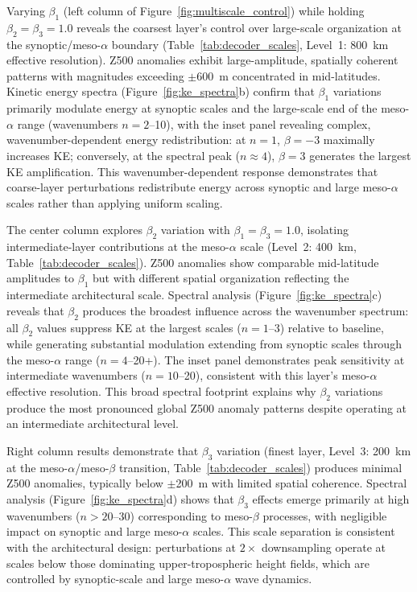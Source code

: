 \documentclass{agujournal2019}
\begin{document}
Varying $\beta_1$ (left column of Figure~\ref{fig:multiscale_control}) while holding $\beta_2 = \beta_3 = 1.0$ reveals the coarsest layer's control over large-scale organization at the synoptic/meso-$\alpha$ boundary (Table~\ref{tab:decoder_scales}, Level~1: 800~km effective resolution). Z500 anomalies exhibit large-amplitude, spatially coherent patterns with magnitudes exceeding $\pm$600~m concentrated in mid-latitudes. Kinetic energy spectra (Figure~\ref{fig:ke_spectra}b) confirm that $\beta_1$ variations primarily modulate energy at synoptic scales and the large-scale end of the meso-$\alpha$ range (wavenumbers $n=2$--10), with the inset panel revealing complex, wavenumber-dependent energy redistribution: at $n=1$, $\beta=-3$ maximally increases KE; conversely, at the spectral peak ($n \approx 4$), $\beta=3$ generates the largest KE amplification. This wavenumber-dependent response demonstrates that coarse-layer perturbations redistribute energy across synoptic and large meso-$\alpha$ scales rather than applying uniform scaling.

The center column explores $\beta_2$ variation with $\beta_1 = \beta_3 = 1.0$, isolating intermediate-layer contributions at the meso-$\alpha$ scale (Level~2: 400~km, Table~\ref{tab:decoder_scales}). Z500 anomalies show comparable mid-latitude amplitudes to $\beta_1$ but with different spatial organization reflecting the intermediate architectural scale. Spectral analysis (Figure~\ref{fig:ke_spectra}c) reveals that $\beta_2$ produces the broadest influence across the wavenumber spectrum: all $\beta_2$ values suppress KE at the largest scales ($n=1$--3) relative to baseline, while generating substantial modulation extending from synoptic scales through the meso-$\alpha$ range ($n=4$--20+). The inset panel demonstrates peak sensitivity at intermediate wavenumbers ($n=10$--20), consistent with this layer's meso-$\alpha$ effective resolution. This broad spectral footprint explains why $\beta_2$ variations produce the most pronounced global Z500 anomaly patterns despite operating at an intermediate architectural level.

Right column results demonstrate that $\beta_3$ variation (finest layer, Level~3: 200~km at the meso-$\alpha$/meso-$\beta$ transition, Table~\ref{tab:decoder_scales}) produces minimal Z500 anomalies, typically below $\pm$200~m with limited spatial coherence. Spectral analysis (Figure~\ref{fig:ke_spectra}d) shows that $\beta_3$ effects emerge primarily at high wavenumbers ($n>20$--30) corresponding to meso-$\beta$ processes, with negligible impact on synoptic and large meso-$\alpha$ scales. This scale separation is consistent with the architectural design: perturbations at $2\times$ downsampling operate at scales below those dominating upper-tropospheric height fields, which are controlled by synoptic-scale and large meso-$\alpha$ wave dynamics.
\end{document}
